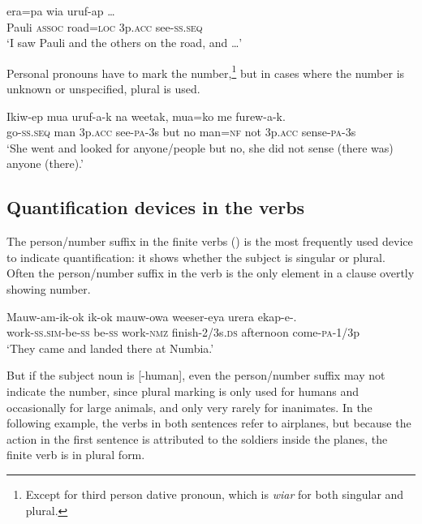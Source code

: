 \ea%
\label{ex:6:x1295}
\gll {}    era=pa  wia  uruf-ap  {\dots} \\
Pauli  \textsc{assoc}  road=\textsc{loc}  3p.\textsc{acc}  see-\textsc{ss}.\textsc{seq}\\
\glt `I saw Pauli and the others on the road, and {\dots}'
\z

Personal pronouns have to mark the number,\footnote{Except for third person dative pronoun, which is \textit{wiar} for both singular and plural.} but in cases where the number is unknown or unspecified, plural is used.

\ea%
\label{ex:6:x1309}
\gll Ikiw-ep  mua    uruf-a-k  na  weetak,  mua=ko  me   furew-a-k. \\
go-\textsc{ss}.\textsc{seq}  man  3p.\textsc{acc}  see-\textsc{pa}-3s  but  no  man=\textsc{nf}  not 3p.\textsc{acc}  sense-\textsc{pa}-3s\\
\glt `She went and looked for anyone/people but no, she did not sense (there was) anyone (there).'
\z

\subsection{Quantification devices in the verbs} \label{sec:6.4.2}

The person/number suffix in the finite verbs () is the most frequently used device to indicate quantification: it shows whether the subject is singular or plural. Often the person/number suffix in the verb is the only element in a clause overtly showing number. 

\ea%
\label{ex:6:x1296}
\gll Mauw-am-ik-ok  ik-ok  mauw-owa  weeser-eya urera  ekap-e-.\\
work-\textsc{ss}.\textsc{sim}-be-\textsc{ss}  be-\textsc{ss}  work-\textsc{nmz}  finish-2/3s.\textsc{ds} afternoon  come-\textsc{pa}-1/3p\\
\glt `They came and landed there at Numbia.'
\z

But if the subject noun is [-human], even the person/number suffix may not indicate the number, since plural marking is only used for humans and occasionally for large animals, and only very rarely for inanimates. In the following example, the verbs in both sentences refer to airplanes, but because the action in the first sentence is attributed to the soldiers inside the planes, the finite verb is in plural form. 

